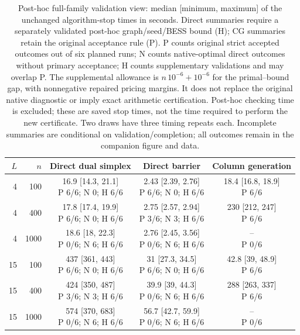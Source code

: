 \begin{table}[htbp]
\centering
\scriptsize
\setlength{\tabcolsep}{4pt}
\begin{tabular}{rrccc}
\hline
$L$ & $n$ & Direct dual simplex & Direct barrier & Column generation \\
\hline
4 & 100 & \shortstack{16.9 [14.3, 21.1]\\P 6/6; N 0; H 6/6} & \shortstack{2.43 [2.39, 2.76]\\P 6/6; N 0; H 6/6} & \shortstack{18.4 [16.8, 18.9]\\P 6/6} \\
4 & 400 & \shortstack{17.8 [17.4, 19.9]\\P 6/6; N 0; H 6/6} & \shortstack{2.75 [2.57, 2.94]\\P 3/6; N 3; H 6/6} & \shortstack{230 [212, 247]\\P 6/6} \\
4 & 1000 & \shortstack{18.6 [18, 22.3]\\P 0/6; N 6; H 6/6} & \shortstack{2.76 [2.45, 3.56]\\P 0/6; N 6; H 6/6} & \shortstack{--\\P 0/6} \\
15 & 100 & \shortstack{437 [361, 443]\\P 6/6; N 0; H 6/6} & \shortstack{31 [27.3, 34.5]\\P 6/6; N 0; H 6/6} & \shortstack{42.8 [39, 48.9]\\P 6/6} \\
15 & 400 & \shortstack{424 [350, 487]\\P 3/6; N 3; H 6/6} & \shortstack{39.9 [39, 44.3]\\P 0/6; N 6; H 6/6} & \shortstack{288 [263, 337]\\P 6/6} \\
15 & 1000 & \shortstack{574 [370, 683]\\P 0/6; N 6; H 6/6} & \shortstack{56.7 [42.7, 59.9]\\P 0/6; N 6; H 6/6} & \shortstack{--\\P 0/6} \\
\hline
\end{tabular}
\caption{Post-hoc full-family validation view: median [minimum, maximum] of the unchanged algorithm-stop times in seconds. Direct summaries require a separately validated post-hoc graph/seed/BESS bound (H); CG summaries retain the original acceptance rule (P). P counts original strict accepted outcomes out of six planned runs; N counts native-optimal direct outcomes without primary acceptance; H counts supplementary validations and may overlap P. The supplemental allowance is $n\,10^{-6}+10^{-6}$ for the primal--bound gap, with nonnegative repaired pricing margins. It does not replace the original native diagnostic or imply exact arithmetic certification. Post-hoc checking time is excluded; these are saved stop times, not the time required to perform the new certificate. Two draws have three timing repeats each. Incomplete summaries are conditional on validation/completion; all outcomes remain in the companion figure and data.}
\label{tab:lp-scaling-posthoc}
\end{table}
